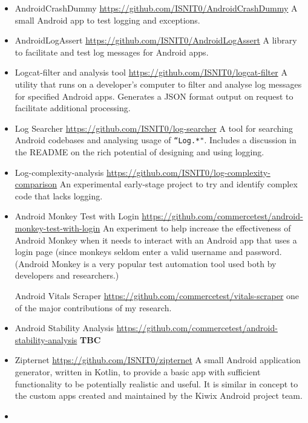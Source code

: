 \begin{itemize}
    \item AndroidCrashDummy \url{https://github.com/ISNIT0/AndroidCrashDummy} A small Android app to test logging and exceptions.
    \item AndroidLogAssert \url{https://github.com/ISNIT0/AndroidLogAssert} A library to facilitate and test log messages for Android apps.
    \item Logcat-filter and analysis tool \url{https://github.com/ISNIT0/logcat-filter} A utility that runs on a developer's computer to filter and analyse log messages for specified Android apps. Generates a JSON format output on request to facilitate additional processing.
    \item Log Searcher \url{https://github.com/ISNIT0/log-searcher} A tool for searching Android codebases and analysing usage of \texttt{``Log.*"}. Includes a discussion in the README on the rich potential of designing and using logging.
    \item Log-complexity-analysis \url{https://github.com/ISNIT0/log-complexity-comparison} An experimental early-stage project to try and identify complex code that lacks logging.  
    \item Android Monkey Test with Login \url{https://github.com/commercetest/android-monkey-test-with-login} An experiment to help increase the effectiveness of Android Monkey when it needs to interact with an Android app that uses a login page (since monkeys seldom enter a valid username and password. (Android Monkey is a very popular test automation tool used both by developers and researchers.) 
    \item [Android] Vitals Scraper \url{https://github.com/commercetest/vitals-scraper} one of the major contributions of my research.
    \item Android Stability Analysis \url{https://github.com/commercetest/android-stability-analysis} \textbf{TBC}
    \item Zipternet \url{https://github.com/ISNIT0/zipternet} A small Android application generator, written in Kotlin, to provide a basic app with sufficient functionality to be potentially realistic and useful. It is similar in concept to the custom apps created and maintained by the Kiwix Android project team.
    \item 
\end{itemize}

